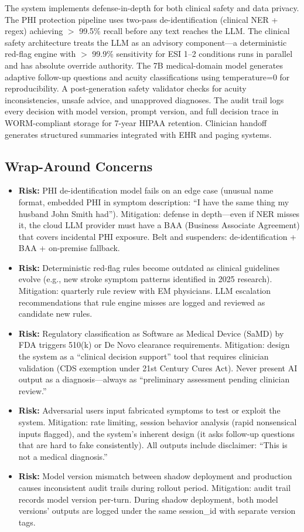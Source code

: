The system implements defense-in-depth for both clinical safety and data privacy. The PHI protection pipeline uses two-pass de-identification (clinical NER + regex) achieving $>$ 99.5\% recall before any text reaches the LLM. The clinical safety architecture treats the LLM as an advisory component---a deterministic red-flag engine with $>$ 99.9\% sensitivity for ESI 1--2 conditions runs in parallel and has absolute override authority. The 7B medical-domain model generates adaptive follow-up questions and acuity classifications using temperature=0 for reproducibility. A post-generation safety validator checks for acuity inconsistencies, unsafe advice, and unapproved diagnoses. The audit trail logs every decision with model version, prompt version, and full decision trace in WORM-compliant storage for 7-year HIPAA retention. Clinician handoff generates structured summaries integrated with EHR and paging systems.

\subsection*{Wrap-Around Concerns}
\begin{itemize}
  \item \textbf{Risk:} PHI de-identification model fails on an edge case (unusual name format, embedded PHI in symptom description: ``I have the same thing my husband John Smith had''). Mitigation: defense in depth---even if NER misses it, the cloud LLM provider must have a BAA (Business Associate Agreement) that covers incidental PHI exposure. Belt and suspenders: de-identification + BAA + on-premise fallback.
  \item \textbf{Risk:} Deterministic red-flag rules become outdated as clinical guidelines evolve (e.g., new stroke symptom patterns identified in 2025 research). Mitigation: quarterly rule review with EM physicians. LLM escalation recommendations that rule engine misses are logged and reviewed as candidate new rules.
  \item \textbf{Risk:} Regulatory classification as Software as Medical Device (SaMD) by FDA triggers 510(k) or De Novo clearance requirements. Mitigation: design the system as a ``clinical decision support'' tool that requires clinician validation (CDS exemption under 21st Century Cures Act). Never present AI output as a diagnosis---always as ``preliminary assessment pending clinician review.''
  \item \textbf{Risk:} Adversarial users input fabricated symptoms to test or exploit the system. Mitigation: rate limiting, session behavior analysis (rapid nonsensical inputs flagged), and the system's inherent design (it asks follow-up questions that are hard to fake consistently). All outputs include disclaimer: ``This is not a medical diagnosis.''
  \item \textbf{Risk:} Model version mismatch between shadow deployment and production causes inconsistent audit trails during rollout period. Mitigation: audit trail records model version per-turn. During shadow deployment, both model versions' outputs are logged under the same session\_id with separate version tags.
\end{itemize}

